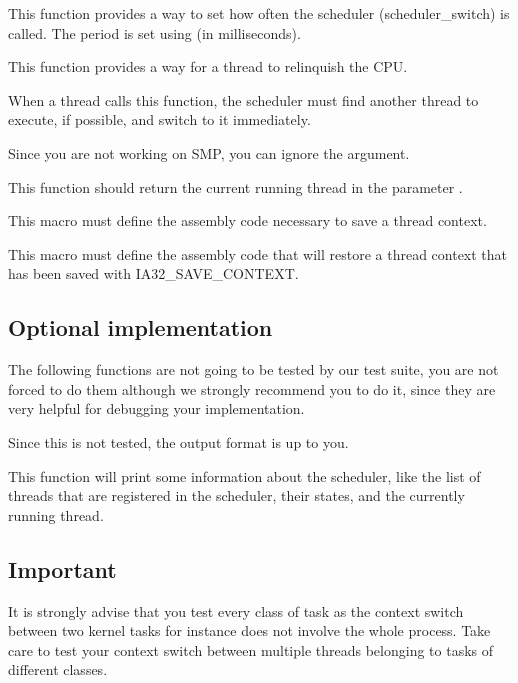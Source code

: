 {
  This function provides a way to set how often the scheduler
  (scheduler\_switch) is called. The period is set using  (in
  milliseconds).
}

{
  This function provides a way for a thread to relinquish the CPU.

  \-

  When a thread calls this function, the scheduler must find another thread
  to execute, if possible, and switch to it immediately.

  \-

  Since you are not working on SMP, you can ignore the 
  argument.
}

{
  This function should return the current running thread in the parameter
  .
}

{
  This macro must define the assembly code necessary to save a thread context.
}

{
  This macro must define the assembly code that will restore a thread context
  that has been saved with IA32\_SAVE\_CONTEXT.
}

\subsection*{Optional implementation}

The following functions are not going to be tested by our test suite, you are
not forced to do them although we strongly recommend you to do it, since they
are very helpful for debugging your implementation.

\-

Since this is not tested, the output format is up to you.

{
  This function will print some information about the scheduler, like the list
  of threads that are registered in the scheduler, their states, and the
  currently running thread.
}

\subsection*{Important}

It is strongly advise that you test every class of task as the context
switch between two kernel tasks for instance does not involve the whole
process. Take care to test your context switch between multiple threads
belonging to tasks of different classes.
